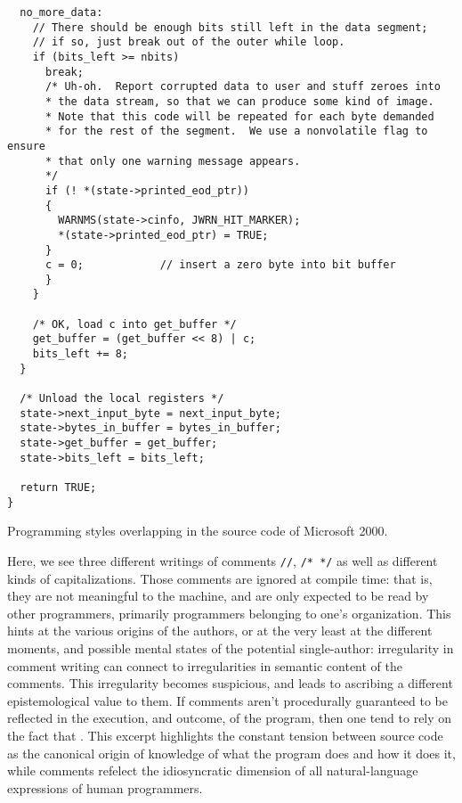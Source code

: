 \begin{listing}
  \begin{verbatim}
  no_more_data:
    // There should be enough bits still left in the data segment; 
    // if so, just break out of the outer while loop. 
    if (bits_left >= nbits)
      break;
      /* Uh-oh.  Report corrupted data to user and stuff zeroes into
      * the data stream, so that we can produce some kind of image.
      * Note that this code will be repeated for each byte demanded
      * for the rest of the segment.  We use a nonvolatile flag to ensure
      * that only one warning message appears.
      */
      if (! *(state->printed_eod_ptr)) 
      {
        WARNMS(state->cinfo, JWRN_HIT_MARKER);
        *(state->printed_eod_ptr) = TRUE;
      }
      c = 0;			// insert a zero byte into bit buffer 
      }
    }

    /* OK, load c into get_buffer */
    get_buffer = (get_buffer << 8) | c;
    bits_left += 8;
  }

  /* Unload the local registers */
  state->next_input_byte = next_input_byte;
  state->bytes_in_buffer = bytes_in_buffer;
  state->get_buffer = get_buffer;
  state->bits_left = bits_left;

  return TRUE;
}
\end{verbatim}
  \caption{Programming styles overlapping in the source code of Microsoft 2000.}
  \label{code:buffer_c}
\end{listing}

Here, we see three different writings of comments \lstinline{//}, \lstinline{/* */} as well as  different kinds of capitalizations. Those comments are ignored at compile time: that is, they are not meaningful to the machine, and are only expected to be read by other programmers, primarily programmers belonging to one's organization. This hints at the various origins of the authors, or at the very least at the different moments, and possible mental states of the potential single-author: irregularity in comment writing can connect to irregularities in semantic content of the comments. This irregularity becomes suspicious, and leads to ascribing a different epistemological value to them. If comments aren't procedurally guaranteed to be reflected in the execution, and outcome, of the program, then one tend to rely on the fact that . This excerpt highlights the constant tension between source code as the canonical origin of knowledge of what the program does and how it does it, while comments refelect the idiosyncratic dimension of all natural-language expressions of human programmers.

